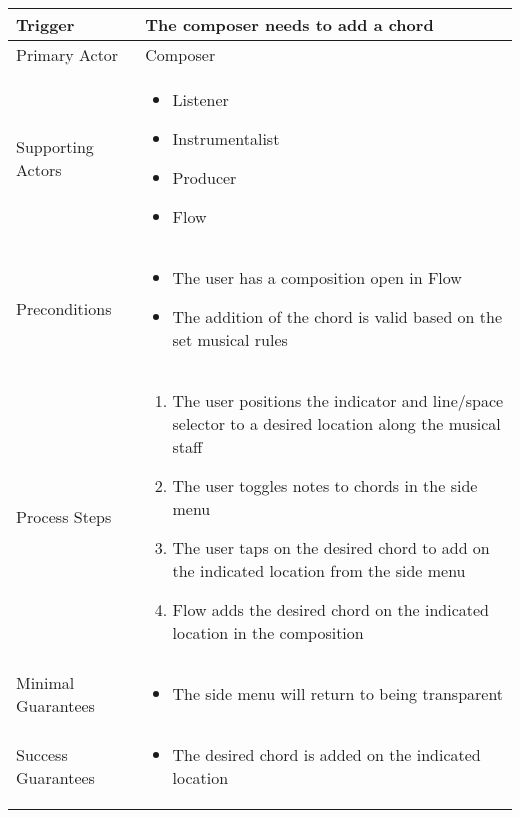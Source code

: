 \begin{longtable}{|X|X|}
\hline
Trigger & The composer needs to add a chord \\
\hline
Primary Actor & 
Composer \\
\hline
Supporting Actors & 
\begin{itemize}
\item Listener
\item Instrumentalist
\item Producer
\item Flow
\end{itemize} \\
\hline
Preconditions & 
\begin{itemize}
\item The user has a composition open in Flow 
\item The addition of the chord is valid based on the set musical rules
\end{itemize} \\
\hline
Process Steps & 
\begin{enumerate}
\item The user positions the indicator and line/space selector to a desired location along the musical staff
\item The user toggles notes to chords in the side menu
\item The user taps on the desired chord to add on the indicated location from the side menu
\item Flow adds the desired chord on the indicated location in the composition
\end{enumerate} \\
\hline
Minimal Guarantees & 
\begin{itemize}
  \item The side menu will return to being transparent
\end{itemize} \\
\hline
Success Guarantees & 
\begin{itemize}
\item The desired chord is added on the indicated location
\end{itemize} \\
\hline
\end{longtable}